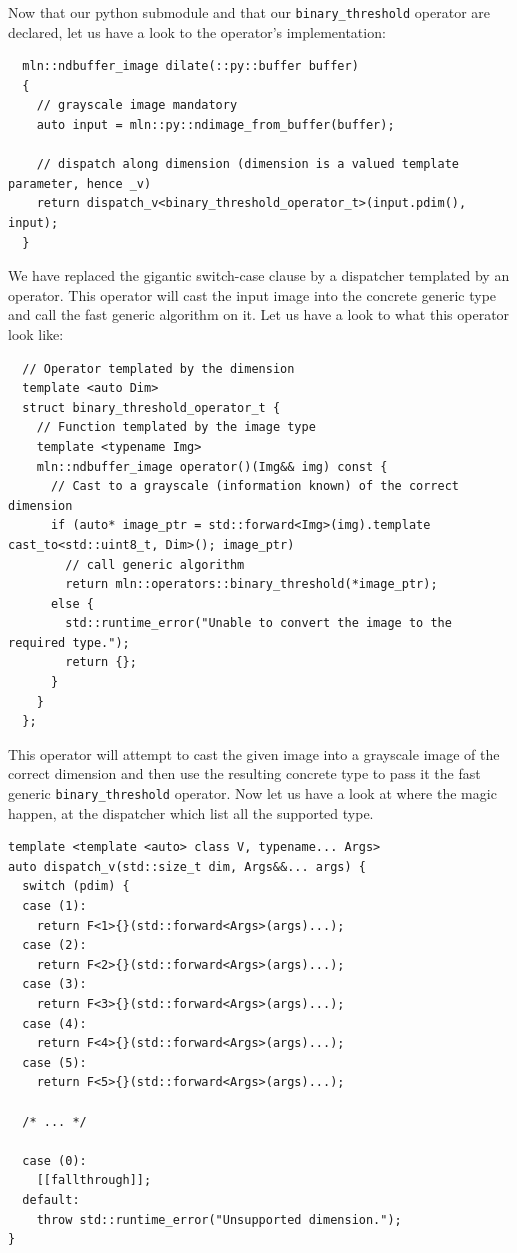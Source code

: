 Now that our python submodule and that our \texttt{binary\_threshold} operator are declared, let us have a look to the
operator's implementation:

\begin{verbatim}
  mln::ndbuffer_image dilate(::py::buffer buffer)
  {
    // grayscale image mandatory
    auto input = mln::py::ndimage_from_buffer(buffer);

    // dispatch along dimension (dimension is a valued template parameter, hence _v)
    return dispatch_v<binary_threshold_operator_t>(input.pdim(), input);
  }
\end{verbatim}

We have replaced the gigantic switch-case clause by a dispatcher templated by an operator. This operator will cast the
input image into the concrete generic type and call the fast generic algorithm on it. Let us have a look to what this
operator look like:

\begin{verbatim}
  // Operator templated by the dimension
  template <auto Dim>
  struct binary_threshold_operator_t {
    // Function templated by the image type
    template <typename Img>
    mln::ndbuffer_image operator()(Img&& img) const {
      // Cast to a grayscale (information known) of the correct dimension
      if (auto* image_ptr = std::forward<Img>(img).template cast_to<std::uint8_t, Dim>(); image_ptr)
        // call generic algorithm
        return mln::operators::binary_threshold(*image_ptr);
      else {
        std::runtime_error("Unable to convert the image to the required type.");
        return {};
      }
    }
  };
\end{verbatim}

This operator will attempt to cast the given image into a grayscale image of the correct dimension and then use the
resulting concrete type to pass it the fast generic \texttt{binary\_threshold} operator. Now let us have a look at where
the magic happen, at the dispatcher which list all the supported type.

\begin{verbatim}
template <template <auto> class V, typename... Args>
auto dispatch_v(std::size_t dim, Args&&... args) {
  switch (pdim) {
  case (1):
    return F<1>{}(std::forward<Args>(args)...);
  case (2):
    return F<2>{}(std::forward<Args>(args)...);
  case (3):
    return F<3>{}(std::forward<Args>(args)...);
  case (4):
    return F<4>{}(std::forward<Args>(args)...);
  case (5):
    return F<5>{}(std::forward<Args>(args)...);

  /* ... */

  case (0):
    [[fallthrough]];
  default:
    throw std::runtime_error("Unsupported dimension.");
}
\end{verbatim}


